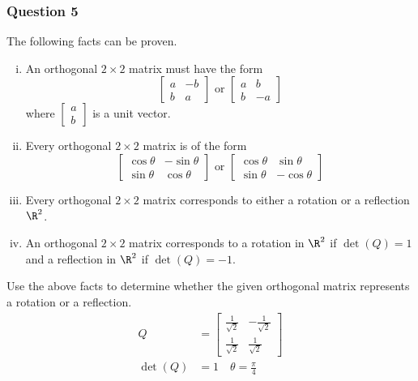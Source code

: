 \documentclass{math}
\begin{document}
\subsubsection*{Question 5}
The following facts can be proven.
\begin{enumerate}[(i)]
  \item An orthogonal \( 2\times2 \) matrix must have the form
  \[ \begin{bmatrix}a & -b \\ b & a\end{bmatrix} \text{ or }
    \begin{bmatrix}a & b \\ b & -a\end{bmatrix} \]
  where \( \begin{bmatrix}a \\ b\end{bmatrix} \) is a unit vector.
  \item Every orthogonal \( 2\times2 \) matrix is of the form
  \[ \begin{bmatrix}
    \cos\theta & -\sin\theta \\
    \sin\theta & \cos\theta
  \end{bmatrix} \text{ or } \begin{bmatrix}
    \cos\theta & \sin\theta \\
    \sin\theta & -\cos\theta
  \end{bmatrix} \]
  \item Every orthogonal \( 2\times2 \) matrix corresponds to either a
    rotation or a reflection \( \R^2 \).
  \item An orthogonal \( 2\times2 \) matrix corresponds to a rotation in
    \( \R^2 \) if \( \det(Q) = 1 \) and a reflection in \( \R^2 \) if
    \( \det(Q) = -1 \).
\end{enumerate}
Use the above facts to determine whether the given orthogonal matrix
represents a rotation or a reflection.
\begin{align*}
  Q &= \begin{bmatrix}
    \frac{1}{\sqrt{2}} & -\frac{1}{\sqrt{2}} \\
    \frac{1}{\sqrt{2}} & \frac{1}{\sqrt{2}}
  \end{bmatrix} \\
  \det(Q) &= 1 \quad \theta = \frac{\pi}{4}
\end{align*}
\end{document}

